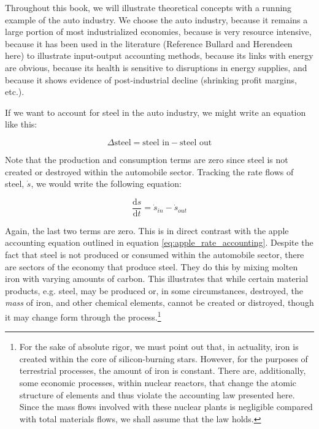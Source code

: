 
Throughout this book, we will illustrate theoretical concepts with
a running example of the auto industry. We choose the auto industry,
because it remains a large portion of most industrialized economies, 
because is very resource intensive,
because it has been used in the literature (Reference Bullard and Herendeen here)
to illustrate input-output accounting methods, 
because its links with energy are obvious,
because its health is sensitive to disruptions in energy supplies, and
because it shows evidence of post-industrial decline (shrinking profit margins, etc.).

If we want to account for steel in the auto industry, 
we might write an equation like this:

\begin{equation}
	\Delta\textrm{steel} 
	= \textrm{steel in} 
	- \textrm{steel out} 
\end{equation}

Note that the production and consumption terms are zero
since steel is not created or destroyed within the automobile
sector. Tracking the rate flows of steel, 
$\dot{s}$,
we would write the following equation:

\begin{equation}
	\frac{\mathrm{d}s}{\mathrm{d}t}
	= \dot{s}_{in}
	- \dot{s}_{out}
\end{equation}

Again, the last two terms are zero. This is in direct contrast with the apple 
accounting equation outlined in equation \ref{eq:apple_rate_accounting}. Despite 
the fact that steel is not produced or consumed within the automobile sector, 
there are sectors of the economy that produce steel. They do this by mixing molten
iron with varying amounts of carbon. This illustrates that while certain material
products, e.g. steel, may be produced or, in some circumstances, destroyed, the
\emph{mass} of iron, and other chemical elements, cannot be created or distroyed,
though it may change form through the process.\footnote{For the sake of
absolute rigor, we must point out that, in actuality, iron is created within
the core of silicon-burning stars. However, for the purposes of terrestrial
processes, the amount of iron is constant. There are, additionally, some economic
processes, within nuclear reactors, that change the atomic structure of elements
and thus violate the accounting law presented here. Since the mass flows involved
with these nuclear plants is negligible compared with total materials flows, we
shall assume that the law holds.} 



